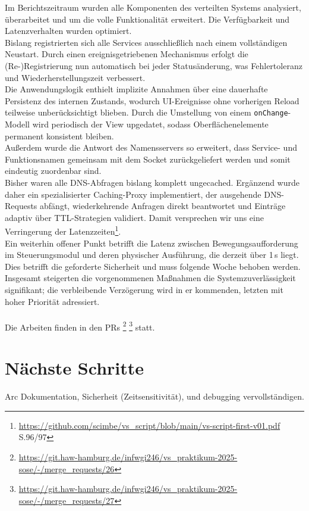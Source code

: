 \documentclass{article}
\begin{document}
\noindent
Im Berichtszeitraum wurden alle Komponenten des verteilten Systems analysiert, überarbeitet und um die volle Funktionalität erweitert. Die Verfügbarkeit und Latenzverhalten wurden optimiert.\\
Bislang registrierten sich alle Services ausschließlich nach einem vollständigen Neustart. Durch einen ereignisgetriebenen Mechanismus erfolgt die (Re-)Registrierung nun automatisch bei jeder Statusänderung, was Fehlertoleranz und Wiederherstellungszeit verbessert.\\
Die Anwendungslogik enthielt implizite Annahmen über eine dauerhafte Persistenz des internen Zustands, wodurch UI-Ereignisse ohne vorherigen Reload teilweise unberücksichtigt blieben. Durch die Umstellung von einem \texttt{onChange}-Modell wird periodisch der View upgedatet, sodass Oberflächenelemente permanent konsistent bleiben.\\
Außerdem wurde die Antwort des Namensservers so erweitert, dass Service- und Funktionsnamen gemeinsam mit dem Socket zurückgeliefert werden und somit eindeutig zuordenbar sind.\\
Bisher waren alle DNS-Abfragen bislang komplett ungecached. Ergänzend wurde daher ein spezialisierter Caching-Proxy implementiert, der ausgehende DNS-Requests abfängt, wiederkehrende Anfragen direkt beantwortet und Einträge adaptiv über TTL-Strategien validiert. Damit versprechen wir uns eine Verringerung der Latenzzeiten\footnote{\url{https://github.com/scimbe/vs_script/blob/main/vs-script-first-v01.pdf} S.96/97}.\\
Ein weiterhin offener Punkt betrifft die Latenz zwischen Bewegungsaufforderung im Steuerungsmodul und deren physischer Ausführung, die derzeit über 1\,s liegt. Dies betrifft die geforderte Sicherheit und muss folgende Woche behoben werden.\\
Insgesamt steigerten die vorgenommenen Maßnahmen die Systemzuverlässigkeit signifikant; die verbleibende Verzögerung wird in er kommenden, letzten mit hoher Priorität adressiert.
\\ \\
Die Arbeiten finden in den PRs \footnote{\url{https://git.haw-hamburg.de/infwgi246/vs_praktikum-2025-sose/-/merge_requests/26}} \footnote{\url{https://git.haw-hamburg.de/infwgi246/vs_praktikum-2025-sose/-/merge_requests/27}} statt. 

\section{Nächste Schritte}

Arc Dokumentation, Sicherheit (Zeitsensitivität), und debugging vervollständigen.
\end{document}
